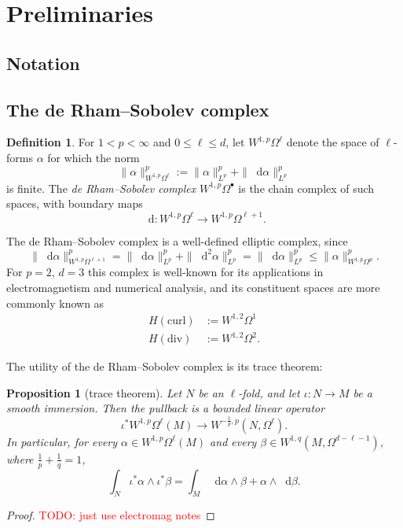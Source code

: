 \documentclass[reqno,11pt]{amsart}
\newcommand*\dif{\mathop{}\!\mathrm{d}}
\newcommand{\dfn}[1]{\emph{#1}\index{#1}}
\newtheorem{proposition}[theorem]{Proposition}
\theoremstyle{definition}
\newtheorem{definition}[theorem]{Definition}
\numberwithin{equation}{section}
\newcommand\todo[1]{\textcolor{red}{TODO: #1}}
\begin{document}
\section{Preliminaries}
\subsection{Notation}
\subsection{The de Rham--Sobolev complex}
\begin{definition}
For $1 < p < \infty$ and $0 \leq \ell \leq d$, let $W^{1, p}\Omega^\ell$ denote the space of $\ell$-forms $\alpha$ for which the norm
$$\|\alpha\|_{W^{1, p} \Omega^\ell}^p := \|\alpha\|_{L^p}^p + \|\dif \alpha\|_{L^p}^p$$
is finite.
The \dfn{de Rham--Sobolev complex} $W^{1, p} \Omega^\bullet$ is the chain complex of such spaces, with boundary maps 
$$\dif: W^{1, p} \Omega^\ell \to W^{1, p} \Omega^{\ell + 1}.$$
\end{definition}

The de Rham--Sobolev complex is a well-defined elliptic complex, since 
$$\|\dif \alpha\|_{W^{1, p} \Omega^{\ell + 1}}^p = \|\dif \alpha\|_{L^p}^p + \|\dif^2 \alpha\|_{L^p}^p = \|\dif \alpha\|_{L^p}^p \leq \|\alpha\|_{W^{1, p} \Omega^p}^p.$$
For $p = 2$, $d = 3$ this complex is well-known for its applications in electromagnetism and numerical analysis, and its constituent spaces are more commonly known as \cite[Chapter 2]{cessenat1996mathematical}
\begin{align*}
H(\text{curl}) &:= W^{1, 2} \Omega^1 \\
H(\text{div}) &:= W^{1, 2} \Omega^2.
\end{align*}

The utility of the de Rham--Sobolev complex is its trace theorem:

\begin{proposition}[trace theorem]
Let $N$ be an $\ell$-fold, and let $\iota: N \to M$ be a smooth immersion.
Then the pullback is a bounded linear operator 
$$\iota^* W^{1, p} \Omega^\ell(M) \to W^{-\frac{1}{p}, p}(N, \Omega^\ell).$$
In particular, for every $\alpha \in W^{1, p} \Omega^\ell(M)$ and every $\beta \in W^{1, q}(M, \Omega^{d - \ell - 1})$, where $\frac{1}{p} + \frac{1}{q} = 1$,
$$\int_N \iota^* \alpha \wedge \iota^* \beta = \int_M \dif \alpha \wedge \beta + \alpha \wedge \dif \beta.$$
\end{proposition}
\begin{proof}
\todo{just use electromag notes}
\end{proof}
\end{document}
